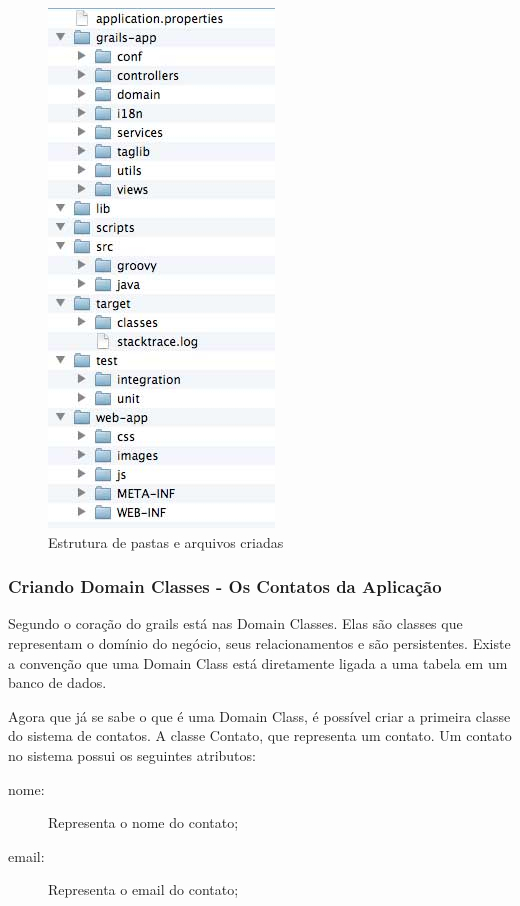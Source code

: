 \documentclass[12pt]{article}
\begin{document}
    \begin{figure}[h!]
    \centering
    \includegraphics[width=.4\textwidth]{images/appStructure.jpg}
    \caption{Estrutura de pastas e arquivos criadas}
    \label{fig:appStructure}
    \end{figure}

\subsubsection{Criando Domain Classes - Os Contatos da Aplicação}

    Segundo \cite{pragmaticGrails:2009} o coração do grails está nas Domain Classes.
    Elas são classes que representam o domínio do negócio, seus relacionamentos e
    são persistentes. Existe a convenção que uma Domain Class está diretamente 
    ligada a uma tabela em um banco de dados.
    
    Agora que já se sabe o que é uma Domain Class, é possível criar a primeira
    classe do sistema de contatos. A classe Contato, que representa um contato.
    Um contato no sistema possui os seguintes atributos:
    
    \begin{description}
        \item[nome:] Representa o nome do contato;
        \item[email:] Representa o email do contato;
    \end{description}
    
\end{document}
